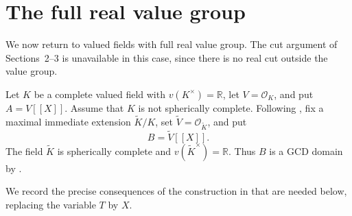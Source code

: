 \documentclass[12pt]{amsart}
\newtheorem{example}[theorem]{Example}
\theoremstyle{plain}
\newcommand{\fd}{\operatorname{fd}}
\begin{document}

\section{The full real value group}\label{sec:full-real}

\noindent We now return to valued fields with full real value group. The cut argument of Sections~2--3 is unavailable in this case, since there is no real cut outside the value group.

Let $K$ be a complete valued field with
$v(K^\times)=\mathbb R$, let $V=\mathcal O_K$, and put $A=V[[X]]$.
Assume that $K$ is not spherically complete.  Following \cite{Wang}, fix a
maximal immediate extension $\widetilde K/K$, set
$\widetilde V=\mathcal O_{\widetilde K}$, and put
\[
  B=\widetilde V[[X]].
\]
The field $\widetilde K$ is spherically complete and
$v(\widetilde K^\times)=\mathbb R$. Thus $B$ is a GCD domain by
\cite[Theorem~1.1(i)]{Wang}.

We record the precise consequences of the construction in \cite{Wang} that are needed below, replacing the variable $T$ by $X$.
\end{document}
